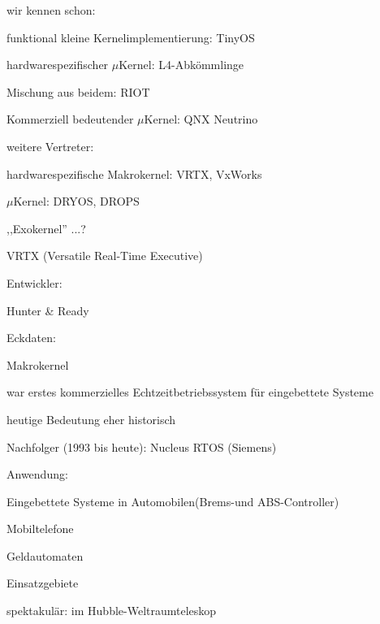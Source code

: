 \documentclass[a4paper]{article}
\begin{document}
\begin{multicols}{3}
    \begin{itemize*}
        \item wir kennen schon:
        \begin{itemize*}
            \item funktional kleine Kernelimplementierung: TinyOS
            \item hardwarespezifischer $\mu$Kernel: L4-Abkömmlinge
            \item Mischung aus beidem: RIOT
            \item Kommerziell bedeutender $\mu$Kernel: QNX Neutrino
        \end{itemize*}
        \item weitere Vertreter:
        \begin{itemize*}
            \item hardwarespezifische Makrokernel: VRTX, VxWorks
            \item $\mu$Kernel: DRYOS, DROPS
            \item ,,Exokernel'' ...?
        \end{itemize*}
    \end{itemize*}

    VRTX (Versatile Real-Time Executive)

    \begin{itemize*}
        \item Entwickler:
        \begin{itemize*}
            \item Hunter \& Ready
        \end{itemize*}
        \item Eckdaten:
        \begin{itemize*}
            \item Makrokernel
            \item war erstes kommerzielles Echtzeitbetriebssystem für eingebettete Systeme
            \item heutige Bedeutung eher historisch
            \item Nachfolger (1993 bis heute): Nucleus RTOS (Siemens)
        \end{itemize*}
        \item Anwendung:
        \begin{itemize*}
            \item Eingebettete Systeme in Automobilen(Brems-und ABS-Controller)
            \item Mobiltelefone
            \item Geldautomaten
        \end{itemize*}
        \item Einsatzgebiete
        \begin{itemize*}
            \item spektakulär: im Hubble-Weltraumteleskop
        \end{itemize*}
    \end{itemize*}


\end{multicols}
\end{document}

